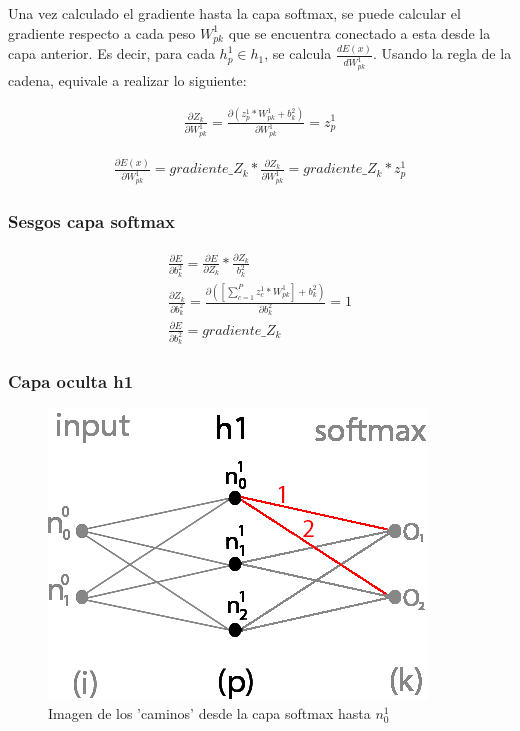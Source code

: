 Una vez calculado el gradiente hasta la capa softmax, se puede calcular el gradiente respecto a cada peso $W^1_{pk}$ que se encuentra conectado a esta desde la capa anterior. Es decir, para cada $h^1_p\in h_1$, se calcula $\frac{dE(x)}{dW^1_{pk}}$. Usando la regla de la cadena, equivale a realizar lo siguiente:


\begin{gather}
	\frac{\partial Z_k}{\partial W^1_{pk}} = \frac{\partial (z^1_p * W^1 _{pk}+ b^2_k)}{\partial W^1_{pk }} = z^1_p
	\label{grad_w1pk_1}
\end{gather}

\begin{gather}
	\frac{\partial E(x)}{\partial W^1_{pk }} =  gradiente\_Z_k * \frac{\partial Z_k}{\partial W^1_{pk }} = gradiente\_Z_k * z^1_p
	\label{grad_w1pk_2}
\end{gather}

\subsubsection{Sesgos capa softmax}

\begin{gather}
	\frac{\partial E}{\partial b^2_k} = \frac{\partial E}{\partial Z_k} * \frac{\partial Z_k}{b^2_k} \\
	\frac{\partial Z_k }{\partial b^2_k } = \frac{\partial ([\sum_{c=1}^{P} z^1_c * W^1_{pk}] + b^2_k) }{\partial b^2_k } = 1 \\
	\frac{\partial E}{\partial b^2_k} = gradiente\_Z_k
\end{gather}

\subsubsection{Capa oculta h1}

\begin{figure}[H]
	\centering
	\includegraphics[scale=0.35]{imagenes/nn_caminos_posibles.jpg}  
	\caption{Imagen de los 'caminos' desde la capa softmax hasta $n^1_0$}
	\label{nn_caminos_posibles}
\end{figure}

